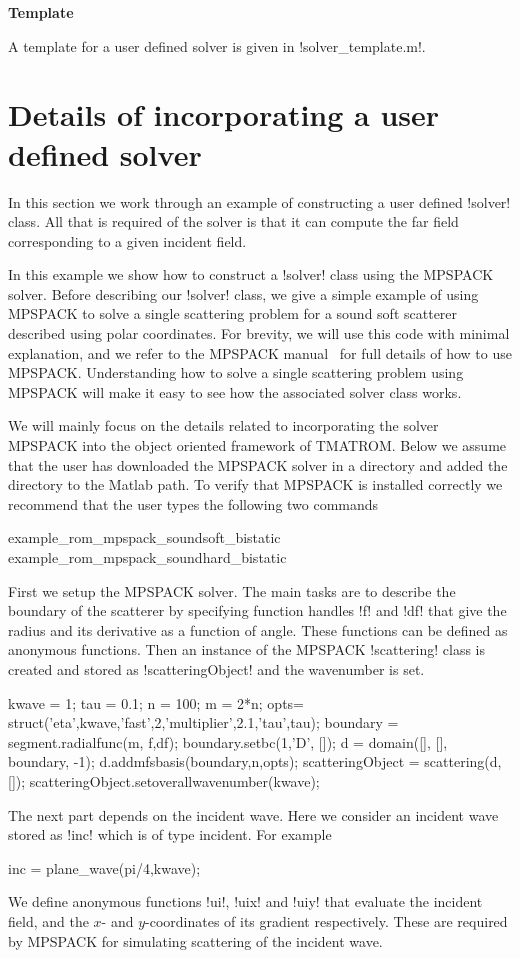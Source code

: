 \documentclass[12pt,letterpaper,final]{article}
\newcommand{\techheading}[1]{%
    \par\vspace{-0.3\parskip}\noindent\hspace{-1cm}\textbf{#1}%
    \par\vspace{-0.5\parskip}\noindent\nopagebreak\ignorespaces}
\begin{document}
\techheading{Template}
A template for a user defined solver is given in !solver_template.m!.

\section{Details of incorporating a user defined solver}

In this section we work through an example of constructing a user defined
!solver! class. 
All that is required of the solver is that it can compute the far field 
corresponding to a given incident field.

In this example we show how to construct a !solver! class 
using the 
MPSPACK~\cite{mpspack:manual} solver.
Before describing our !solver! class, we give a simple 
example of using MPSPACK to solve a single scattering problem for a 
sound soft scatterer described using polar coordinates.
For brevity, we will use this code with minimal explanation, and we refer
to the MPSPACK manual~\cite{mpspack:manual} for full details of how to
use MPSPACK.
Understanding how to solve a single scattering problem using MPSPACK will make it easy to see
how the associated solver class works.

We will mainly focus on the details related to incorporating the solver MPSPACK into 
the object oriented framework of TMATROM. Below we assume that the user has downloaded the
MPSPACK solver in a directory and added the directory to the Matlab path.
To verify that MPSPACK is installed correctly
we recommend that the user types the following two commands 
\begin{matlab}
example_rom_mpspack_soundsoft_bistatic
example_rom_mpspack_soundhard_bistatic
\end{matlab}

First we setup the MPSPACK solver.
The main tasks are to describe the boundary of the scatterer by specifying
function handles !f! and !df! that give the radius and its derivative as a 
function of angle.
These functions can be defined as anonymous functions.
Then an instance of the MPSPACK !scattering! class is created
and stored as !scatteringObject! and the wavenumber is set.
\begin{matlab}
kwave = 1;
tau = 0.1;
n = 100;
m = 2*n;
opts= struct('eta',kwave,'fast',2,'multiplier',2.1,'tau',tau);
boundary = segment.radialfunc(m, {f,df});
boundary.setbc(1,'D', []);
d = domain([], [], boundary, -1);
d.addmfsbasis(boundary,n,opts);
scatteringObject = scattering(d, []);
scatteringObject.setoverallwavenumber(kwave);
\end{matlab}
The next part depends on the incident wave.
Here we consider an incident wave stored as !inc! which is of type incident.
For example
\begin{matlab}
inc = plane_wave(pi/4,kwave);
\end{matlab}
We define anonymous functions !ui!, !uix! and !uiy! 
that evaluate the incident field, and the $x$- and $y$-coordinates of its
gradient respectively.
These are required by MPSPACK for simulating scattering of the incident wave.
\end{document}
